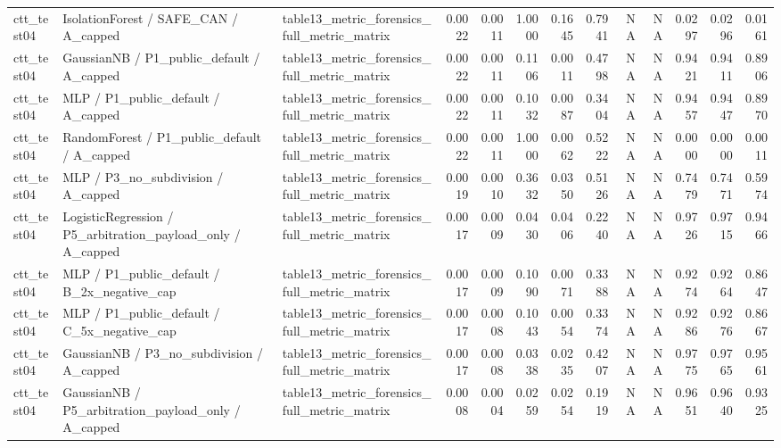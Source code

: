 \begin{tabular}{lllrrrrrrrrrr}
ctt\_test04 & IsolationForest / SAFE\_CAN / A\_capped & table13\_metric\_forensics\_full\_metric\_matrix & 0.0022 & 0.0011 & 1.0000 & 0.1645 & 0.7941 & NA & NA & 0.0297 & 0.0296 & 0.0161 \\
ctt\_test04 & GaussianNB / P1\_public\_default / A\_capped & table13\_metric\_forensics\_full\_metric\_matrix & 0.0022 & 0.0011 & 0.1106 & 0.0011 & 0.4798 & NA & NA & 0.9421 & 0.9411 & 0.8906 \\
ctt\_test04 & MLP / P1\_public\_default / A\_capped & table13\_metric\_forensics\_full\_metric\_matrix & 0.0022 & 0.0011 & 0.1032 & 0.0087 & 0.3404 & NA & NA & 0.9457 & 0.9447 & 0.8970 \\
ctt\_test04 & RandomForest / P1\_public\_default / A\_capped & table13\_metric\_forensics\_full\_metric\_matrix & 0.0022 & 0.0011 & 1.0000 & 0.0062 & 0.5222 & NA & NA & 0.0000 & 0.0000 & 0.0011 \\
ctt\_test04 & MLP / P3\_no\_subdivision / A\_capped & table13\_metric\_forensics\_full\_metric\_matrix & 0.0019 & 0.0010 & 0.3632 & 0.0350 & 0.5126 & NA & NA & 0.7479 & 0.7471 & 0.5974 \\
ctt\_test04 & LogisticRegression / P5\_arbitration\_payload\_only / A\_capped & table13\_metric\_forensics\_full\_metric\_matrix & 0.0017 & 0.0009 & 0.0430 & 0.0406 & 0.2240 & NA & NA & 0.9726 & 0.9715 & 0.9466 \\
ctt\_test04 & MLP / P1\_public\_default / B\_2x\_negative\_cap & table13\_metric\_forensics\_full\_metric\_matrix & 0.0017 & 0.0009 & 0.1090 & 0.0071 & 0.3388 & NA & NA & 0.9274 & 0.9264 & 0.8647 \\
ctt\_test04 & MLP / P1\_public\_default / C\_5x\_negative\_cap & table13\_metric\_forensics\_full\_metric\_matrix & 0.0017 & 0.0008 & 0.1043 & 0.0054 & 0.3374 & NA & NA & 0.9286 & 0.9276 & 0.8667 \\
ctt\_test04 & GaussianNB / P3\_no\_subdivision / A\_capped & table13\_metric\_forensics\_full\_metric\_matrix & 0.0017 & 0.0008 & 0.0338 & 0.0235 & 0.4207 & NA & NA & 0.9775 & 0.9765 & 0.9561 \\
ctt\_test04 & GaussianNB / P5\_arbitration\_payload\_only / A\_capped & table13\_metric\_forensics\_full\_metric\_matrix & 0.0008 & 0.0004 & 0.0259 & 0.0254 & 0.1919 & NA & NA & 0.9651 & 0.9640 & 0.9325 \\
\bottomrule
\end{tabular}
